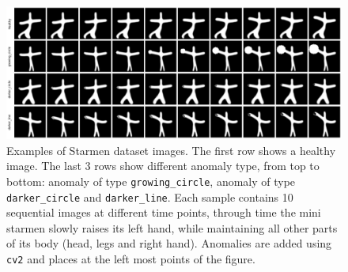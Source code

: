\begin{figure}
    \centering
    \includegraphics[width=0.75\linewidth]{figures/example_starmen.png}
    \caption[Example of \texttt{Starmen} dataset]{Examples of Starmen dataset images. The first row shows a healthy image. The last 3 rows show different anomaly type, from top to bottom: anomaly of type \texttt{growing\_circle}, anomaly of type \texttt{darker\_circle} and \texttt{darker\_line}. Each sample contains 10 sequential images at different time points, through time the mini starmen slowly raises its left hand, while maintaining all other parts of its body (head, legs and right hand). Anomalies are added using \texttt{cv2} and places at the left most points of the figure.}
    \label{fig:example_starmen}
\end{figure}




    
